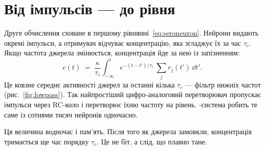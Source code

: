 \section{Від імпульсів --- до рівня}

Друге обчислення сховане в першому рівнянні~\eqref{eq:seroneuron}. Нейрони видають окремі імпульси, а отримувач відчуває концентрацію, яка згладжує їх за час $\tau_c$. Якщо частота джерела змінюється, концентрація йде за нею із запізненням:
\begin{equation}
c(t) \;=\; \frac{\kappa}{\tau_c}\int_{-\infty}^{t} e^{-(t-t')/\tau_c}\,\sum_j r_j(t')\,\dd t' .
\label{eq:lowpass}
\end{equation}
Це ковзне середнє активності джерел за останні кілька $\tau_c$ --- фільтр нижніх частот (рис.~\ref{fig:lowpass}). Так найпростіший цифро-аналоговий перетворювач пропускає імпульси через RC-коло і перетворює їхню частоту на рівень. -система робить те саме із сотнями тисяч нейронів одночасно.

Ця величина водночас і пам'ять. Після того як джерела замовкли, концентрація тримається ще час порядку $\tau_c$. Це не біт, а слід, що плавно тане.

